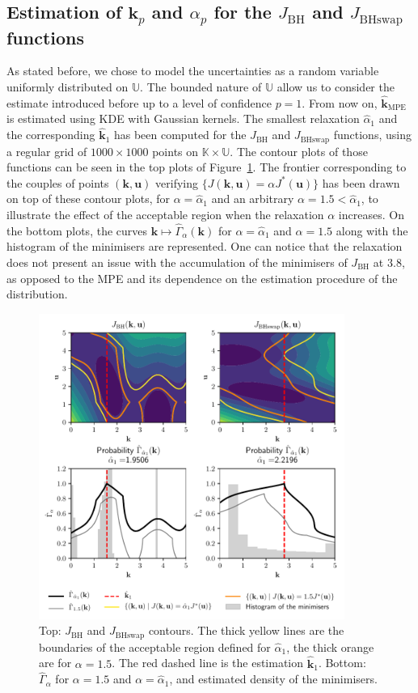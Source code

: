\documentclass[preprint, 1p]{elsarticle}
\newcommand{\hatkmpe}{\hat{\mathbf{k}}_{\mathrm{MPE}}}
\newcommand{\checkap}{{\alpha}_p}
\newcommand{\checka}{{\alpha}}
\newcommand{\checkk}{\mathbf{k}}
\newcommand{\checkkp}{{\mathbf{k}}_p}
\newcommand{\Kspace}{\mathbb{K}}
\newcommand{\Uspace}{\mathbb{U}}
\newcommand{\JBH}{J_{\mathrm{BH}}}
\begin{document}
\subsection{Estimation of $\checkkp$ and $\checkap$ for the $J_{\mathrm{BH}}$ and $J_{\mathrm{BHswap}}$ functions}
As stated before, we chose to model the uncertainties as a random variable uniformly distributed on $\Uspace$. The bounded nature of $\Uspace$ allow us to consider the estimate introduced before up to a level of confidence $p=1$.
From now on, $\hatkmpe$ is estimated using KDE with Gaussian kernels.
The smallest relaxation $\hat{\checka}_1$ and the corresponding $\hat{\checkk}_1$ has been computed for the $J_{\mathrm{BH}}$ and $J_{\mathrm{BHswap}}$ functions, using a regular grid of $1000 \times 1000$ points on $\Kspace\times\Uspace$. The contour plots of those functions can be seen in the top plots of Figure~\ref{fig:contour_alpha}. The frontier corresponding to the couples of points $(\mathbf{k},\mathbf{u})$ verifying $\{J(\mathbf{k},\mathbf{u}) = \alpha J^*(\mathbf{u})\}$ has been drawn on top of these contour plots, for $\alpha=\hat{\checka}_1$ and an arbitrary $\alpha=1.5<\hat{\checka}_1$, to illustrate the effect of the acceptable region when the relaxation $\alpha$ increases. 
On the bottom plots, the curves $\mathbf{k}\mapsto \hat{\Gamma}_{\alpha}(\mathbf{k})$ for $\alpha=\hat{\checka}_1$ and $\alpha=1.5$ along with the histogram of the minimisers are represented.
One can notice that the relaxation does not present an issue with the accumulation of the minimisers of $\JBH$ at $3.8$, as opposed to the MPE and its dependence on the estimation procedure of the distribution.

\begin{figure}[!ht]
  \centering
\includegraphics[width=10cm]{Figures/branin_side_66_relax_gamma_both.pdf}
\caption{Top: $J_{\mathrm{BH}}$ and $J_{\mathrm{BHswap}}$ contours. The thick yellow lines are the boundaries of the acceptable region defined for $\hat{\checka}_1$, the thick orange are for $\alpha=1.5$. The red dashed line is the estimation $\hat{\checkk}_1$. Bottom: $\hat{\Gamma}_{\alpha}$ for $\alpha = 1.5$ and $\alpha=\hat{\checka}_1$, and estimated density of the minimisers.}
\label{fig:contour_alpha}
\end{figure}
\end{document}
